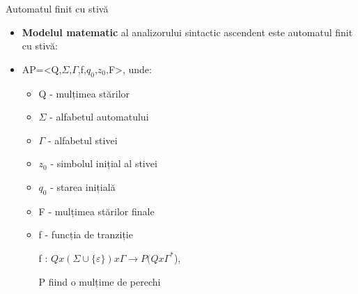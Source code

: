 \documentclass[pdf]{beamer}
\begin{document}
\begin{frame}{Automatul finit cu stivă}
\begin{itemize}

\item
\textbf{Modelul matematic} al analizorului sintactic ascendent este automatul finit cu stivă:

\item
AP=<Q,$\Sigma$,$\Gamma$,f,$q_{0}$,$z_{0}$,F>, unde:

\begin{itemize}
\item 
\hspace{0.5cm}Q - mulțimea stărilor

\item
\hspace{0.5cm}$\Sigma$ - alfabetul automatului

\item
\hspace{0.5cm}$\Gamma$ - alfabetul stivei

\item
\hspace{0.5cm}$z_{0}$ - simbolul inițial al stivei

\item
\hspace{0.5cm}$q_{0}$ - starea inițială

\item
\hspace{0.5cm}F - mulțimea stărilor finale

\item
\hspace{0.5cm}f - funcția de tranziție

f : $Q x (\Sigma \cup \{\varepsilon\}) x \Gamma \to P (Q x \Gamma^{*}$),

P fiind o mulțime de perechi

\end{itemize}
\end{itemize}
\end{frame}
\end{document}
